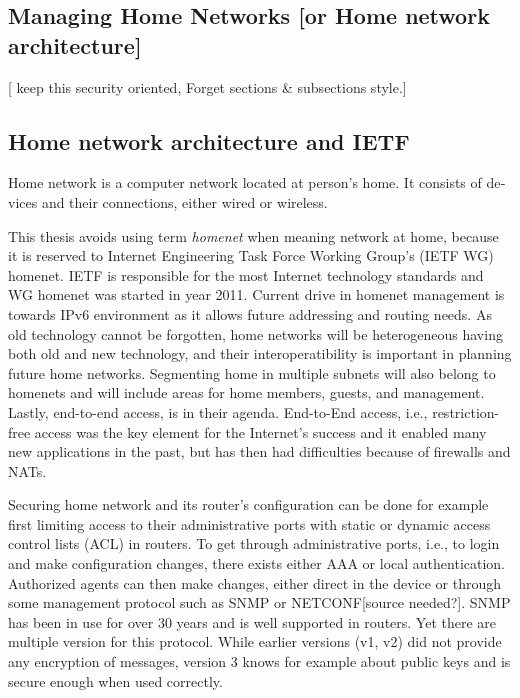 \documentclass[12pt,a4paper,english]{tutthesis}
\begin{document}
\begin{otherlanguage}{english}
\chapter{Managing Home Networks [or Home network architecture]}
\label{sec-3}
[ keep this security oriented, Forget sections \& subsections style.]

\section{Home network architecture and IETF}
\label{sec-3-1}


Home network is a computer network located at person's home. It consists
of devices and their connections, either wired or wireless.

This thesis avoids using term \emph{homenet} when meaning network at home,
because  it is  reserved to 
Internet Engineering Task Force Working Group's (IETF
WG) homenet. IETF is responsible for the most Internet technology standards and 
WG homenet was started in year 2011.
Current drive in homenet management is towards IPv6 environment
 as it allows future  addressing and routing needs. As old technology
cannot be forgotten, home networks will be heterogeneous having both
old and new technology, and their interoperatibility is important in
planning future home networks. 
Segmenting home in multiple subnets will also belong
to homenets and will include areas for home members, guests,
and management. Lastly, end-to-end access, is in their
agenda. End-to-End access, i.e., restriction-free access was the key
element for the Internet's success and it enabled many new
applications in the past, but has then had difficulties because of
firewalls and NATs.



Securing home network and its router's configuration can be done for
example first limiting access to their administrative ports
with static or dynamic access control lists (ACL) in
routers. To get through administrative ports, i.e., to login and make
configuration changes, there exists either AAA or local authentication.
Authorized agents can then make changes, either direct in the device or through some
management protocol such as SNMP or NETCONF[source needed?].  SNMP has been in
use for over 30 years and is well supported in routers. Yet there are
multiple version for this protocol. While earlier versions (v1, v2)
did not provide any encryption of messages, version 3 knows for example
about public keys and is secure enough when used correctly.



\end{otherlanguage}
\end{document}
